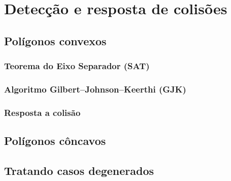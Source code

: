 \chapter{Detecção e resposta de colisões}

\section{Polígonos convexos}

\subsection{Teorema do Eixo Separador (SAT)}

\subsection{Algoritmo Gilbert–Johnson–Keerthi (GJK)}

\subsection{Resposta a colisão}

\section{Polígonos côncavos}

\section{Tratando casos degenerados}

